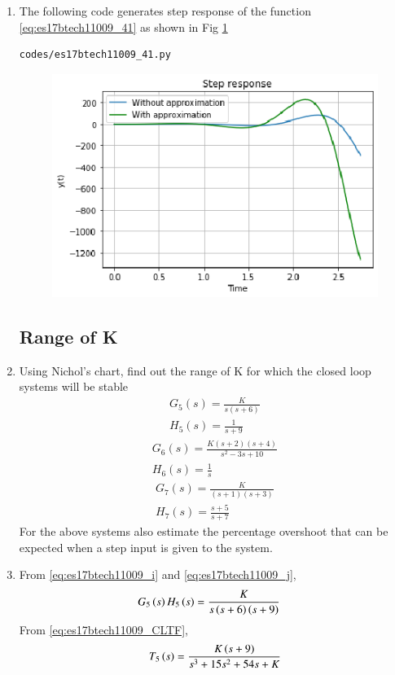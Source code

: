 \begin{enumerate}[label=\thesection.\arabic*.,ref=\thesection.\theenumi]
 \item
The following code generates step response of the function \eqref{eq:es17btech11009_41} as shown in Fig \ref{fig:es17btech11009_fig41}
\begin{lstlisting}
codes/es17btech11009_41.py
\end{lstlisting}
\begin{figure}[!h]
\centering
\includegraphics[width=\columnwidth]{./figs/es17btech11009_41.eps}
\caption{}
\label{fig:es17btech11009_fig41}
\end{figure}

\subsection{Range of K}
\item
Using Nichol's chart, find out the range of K for which the closed loop systems will be stable
\begin{align}
G_{5}(s)= \frac{K}{s(s+6)}
\label{eq:es17btech11009_i}
\\
 H_{5}(s)= \frac{1}{s+9}
 \label{eq:es17btech11009_j}
\end{align}
\begin{align}
G_{6}(s)= \frac{K(s+2)(s+4)}{s^2 - 3s +10}
\label{eq:es17btech11009_k}
\\
 H_{6}(s)= \frac{1}{s}
 \label{eq:es17btech11009_l}
\end{align}
\begin{align}
G_{7}(s)= \frac{K}{(s+1)(s+3)}
\label{eq:es17btech11009_m}
\\
 H_{7}(s)= \frac{s+5}{s+7}
 \label{eq:es17btech11009_n}
\end{align}
For the above systems also estimate the percentage overshoot that can be expected when a step input is given to the system.
\item
From \eqref{eq:es17btech11009_i} and \eqref{eq:es17btech11009_j},
\begin{align}
G_{5}\brak{s}H_{5}\brak{s}&= \frac{K}{s\brak{s+6}\brak{s+9}}
\label{eq:es17btech11009_ee}
\end{align}
\solution
From \eqref{eq:es17btech11009_CLTF},
\begin{align}
T_{5}\brak{s} = \frac{K\brak{s+9}}{s^3 +15s^2 +54s + K}
\label{eq:es17btech11009_51}
 \end{align}


\end{enumerate}
